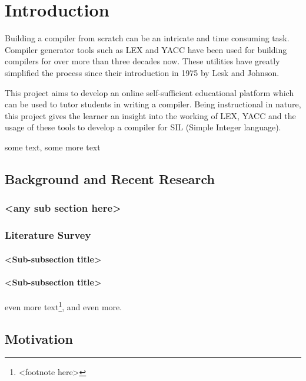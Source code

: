 \chapter{Introduction}

Building a compiler from scratch can be an intricate and time consuming task. Compiler  generator tools such as LEX and YACC have been used for building compilers for over more than three decades now. These utilities have greatly simplified the process since their introduction in 1975 by Lesk and Johnson.

This project aims to develop an online self-sufficient educational platform which can be used to tutor students in writing a compiler. Being instructional in nature, this project gives the learner an insight into the working of LEX, YACC and the usage of these tools to develop a compiler for SIL (Simple Integer language).              

some text\cite{citation-1-name-here}, some more text

\section{Background and Recent Research}
\subsection{<any sub section here>}

\subsection{Literature Survey}

\subsubsection{<Sub-subsection title>}

\subsubsection{<Sub-subsection title>}
even more text\footnote{<footnote here>}, and even more.

\section{Motivation}

